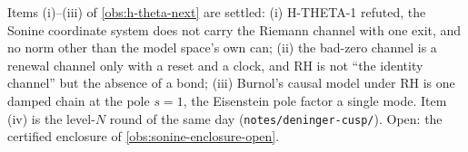 \begin{observation}
\label{obs:h-theta-1-next}
Items (i)--(iii) of \cref{obs:h-theta-next} are settled: (i) H-THETA-1 refuted, the Sonine coordinate system does not
carry the Riemann channel with one exit, and no norm other than the model space's own can; (ii) the bad-zero channel is a
renewal channel only with a reset and a clock, and RH is not ``the identity channel'' but the absence of a bond;
(iii) Burnol's causal model under RH is one damped chain at the pole $s = 1$, the Eisenstein pole factor a single mode.
Item (iv) is the level-$N$ round of the same day (\texttt{notes/deninger-cusp/}). Open: the certified enclosure of
\cref{obs:sonine-enclosure-open}.
\end{observation}
